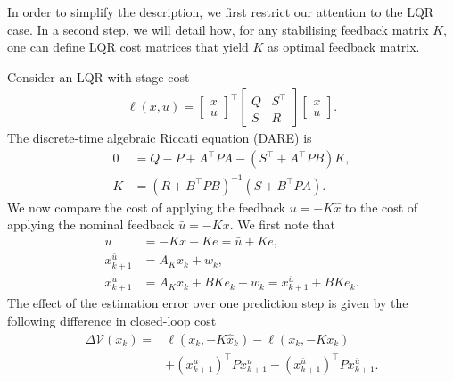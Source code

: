 \documentclass[letterpaper, 10 pt, conference]{ieeeconf}  %
\newcommand {\matr}[2]{\left[\begin{array}{#1}#2\end{array}\right]}
\begin{document}
In order to simplify the description, we first restrict our attention to the LQR case. In a second step, we will detail how, for any stabilising feedback matrix $K$, one can define LQR cost matrices that yield $K$ as optimal feedback matrix.

Consider an LQR with stage cost
\begin{align}
	\label{eq:stage_cost}
	\ell(x,u) = \matr{c}{x \\ u}^\top \matr{ll}{Q & S^\top \\ S & R}\matr{c}{x \\ u}.
\end{align}
The discrete-time algebraic Riccati equation (DARE) is
\begin{subequations}
	\label{eq:dare}
	\begin{align}
		0 &= Q - P + A^\top P A - (S^\top + A^\top P B)K, \\
		K &= (R+B^\top P B)^{-1}(S + B^\top PA).
	\end{align}
\end{subequations}
We now compare the cost of applying the feedback $u = -K\hat x$ to the cost of applying the nominal feedback $\bar u=-Kx$. We first note that
\begin{subequations}
	\begin{align}
		u &= -Kx + Ke = \bar u + K e, \\
		x_{k+1}^{\bar u} &= A_K x_k + w_k, \\
		x_{k+1}^u &= A_K x_k + BKe_k + w_k = x_{k+1}^{\bar u} + BKe_k.
	\end{align}
\end{subequations}
The effect of the estimation error over one prediction step is given by the following difference in closed-loop cost
\begin{align}
	\label{eq:lyap_diff}
	\Delta \mathcal{V}(x_k) =& \ell(x_k,-K\hat x_k) - \ell(x_k,-Kx_k) \nonumber \\
	&+ \left (x_{k+1}^{u}\right )^\top Px_{k+1}^u -\left (x_{k+1}^{\bar u}\right )^\top P x_{k+1}^{\bar u}.
\end{align}
\end{document}

